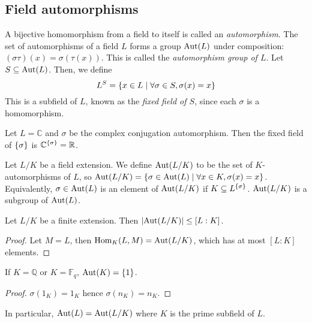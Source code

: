 \subsection{Field automorphisms}
\begin{definition}
	A bijective homomorphism from a field to itself is called an \emph{automorphism}.
	The set of automorphisms of a field \( L \) forms a group \( \operatorname{Aut}(L) \) under composition: \( (\sigma\tau)(x) = \sigma(\tau(x)) \).
	This is called the \emph{automorphism group of \( L \)}.
	Let \( S \subseteq \operatorname{Aut}(L) \).
	Then, we define
	\[ L^S = \qty{x \in L \mid \forall \sigma \in S, \sigma(x) = x} \]
	This is a subfield of \( L \), known as the \emph{fixed field of \( S \)}, since each \( \sigma \) is a homomorphism.
\end{definition}
\begin{example}
	Let \( L = \mathbb C \) and \( \sigma \) be the complex conjugation automorphism.
	Then the fixed field of \( \qty{\sigma} \) is \( \mathbb C^{\qty{\sigma}} = \mathbb R \).
\end{example}
\begin{definition}
	Let \( L / K \) be a field extension.
	We define \( \operatorname{Aut}(L/K) \) to be the set of \( K \)-automorphisms of \( L \), so \( \operatorname{Aut}(L/K) = \qty{\sigma \in \operatorname{Aut}(L) \mid \forall x \in K, \sigma(x) = x} \).
	Equivalently, \( \sigma \in \operatorname{Aut}(L) \) is an element of \( \operatorname{Aut}(L/K) \) if \( K \subseteq L^{\qty{\sigma}} \).
	\( \operatorname{Aut}(L/K) \) is a subgroup of \( \operatorname{Aut}(L) \).
\end{definition}
\begin{theorem}
	Let \( L / K \) be a finite extension.
	Then \( \abs{\operatorname{Aut}(L/K)} \leq [L:K] \).
\end{theorem}
\begin{proof}
	Let \( M = L \), then \( \operatorname{Hom}_K(L,M) = \operatorname{Aut}(L/K) \), which has at most \( [L:K] \) elements.
\end{proof}
\begin{proposition}
	If \( K = \mathbb Q \) or \( K = \mathbb F_q \), \( \operatorname{Aut}(K) = \qty{1} \).
\end{proposition}
\begin{proof}
	\( \sigma(1_K) = 1_K \) hence \( \sigma(n_K) = n_K \).
\end{proof}
In particular, \( \operatorname{Aut}(L) = \operatorname{Aut}(L/K) \) where \( K \) is the prime subfield of \( L \).

